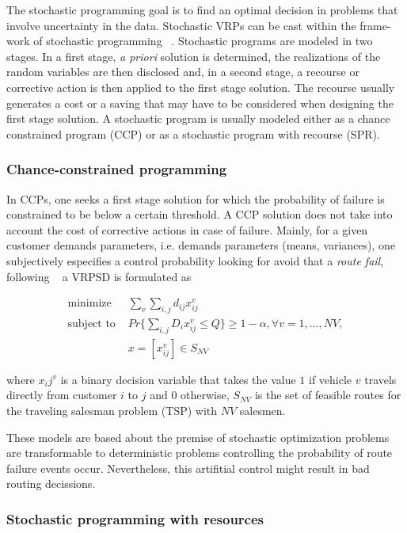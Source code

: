 The stochastic programming goal is to find an optimal decision in problems that involve uncertainty in the data. Stochastic VRPs can be cast within the frame-work of stochastic programming ~\cite{gendreau_stochastic_1996}. Stochastic programs are modeled in two stages. In a first stage, \textit{a priori} solution is determined, the realizations of the random variables are then disclosed and, in a second stage, a recourse or corrective action is then applied to the first stage solution. The recourse usually generates a cost or a saving that may have to be considered when designing the first stage solution. A stochastic program is usually modeled either as a chance constrained program (CCP) or as a stochastic program with recourse (SPR). 

 
\subsubsection{Chance-constrained programming}

In CCPs, one seeks a first stage solution for which the probability of failure is constrained to be below a certain threshold. A CCP solution does not take into account the cost of corrective actions in case of failure. Mainly, for a given customer demands parameters, i.e. demands parameters (means, variances), one subjectively especifies a control probability looking for avoid that a \textit{route fail}, following ~\cite{Dror_2005} a VRPSD is formulated as

\begin{align}\label{eq:CCP}
 \text{minimize } & \sum_v\sum_{i,j}d_{ij}x_{ij}^v\\
 \text{subject to } & Pr\{\sum_{i,j}D_ix_{ij}^v \leq Q\} \geq 1-\alpha, \forall v = 1,\ldots,NV,\\
  & x = [x_{ij}^v] \in S_{NV}
\end{align}

where $x_ij^v$ is a binary decision variable that takes the value $1$ if vehicle $v$ travels directly from customer $i$ to $j$ and $0$ otherwise, $S_{NV}$ is the set of feasible routes for the traveling salesman problem (TSP) with $NV$ salesmen.

These models are based about the premise of stochastic optimization problems are transformable to deterministic problems controlling the probability of route failure events occur. Nevertheless, this artifitial control might result in bad routing decissions.


\subsubsection{Stochastic programming with resources}

